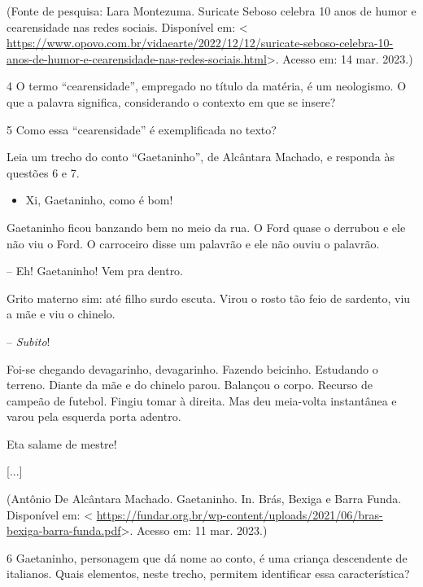 (Fonte de pesquisa: Lara Montezuma. Suricate Seboso celebra 10 anos de
humor e cearensidade nas redes sociais. Disponível em: \textless{}
\url{https://www.opovo.com.br/vidaearte/2022/12/12/suricate-seboso-celebra-10-anos-de-humor-e-cearensidade-nas-redes-sociais.html}\textgreater.
Acesso em: 14 mar. 2023.)

\num{4} O termo ``cearensidade'', empregado no título da matéria, é um
neologismo. O que a palavra significa, considerando o contexto em que se
insere?



\num{5} Como essa ``cearensidade'' é exemplificada no texto?



Leia um trecho do conto ``Gaetaninho'', de Alcântara Machado, e responda
às questões 6 e 7.

\begin{itemize}
\tightlist
\item
  Xi, Gaetaninho, como é bom!
\end{itemize}

Gaetaninho ficou banzando bem no meio da rua. O Ford quase o derrubou e
ele não viu o Ford. O carroceiro disse um palavrão e ele não ouviu o
palavrão.

-- Eh! Gaetaninho! Vem pra dentro.

Grito materno sim: até filho surdo escuta. Virou o rosto tão feio de
sardento, viu a mãe e viu o chinelo.

-- \emph{Subito}!

Foi-se chegando devagarinho, devagarinho. Fazendo beicinho. Estudando o
terreno. Diante da mãe e do chinelo parou. Balançou o corpo. Recurso de
campeão de futebol. Fingiu tomar à direita. Mas deu meia-volta
instantânea e varou pela esquerda porta adentro.

Eta salame de mestre!

{[}...{]}

(Antônio De Alcântara Machado. Gaetaninho. In. Brás, Bexiga e Barra
Funda. Disponível em: \textless{}
\url{https://fundar.org.br/wp-content/uploads/2021/06/bras-bexiga-barra-funda.pdf}\textgreater.
Acesso em: 11 mar. 2023.)

\num{6} Gaetaninho, personagem que dá nome ao conto, é uma criança
descendente de italianos. Quais elementos, neste trecho, permitem
identificar essa característica?

